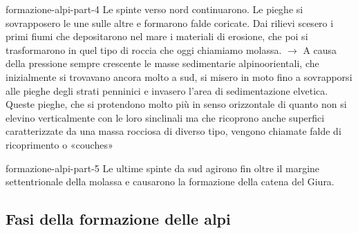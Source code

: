 \documentclass[preview]{standalone}
\begin{document}

\begin{snippet}{formazione-alpi-part-4}
    Le spinte verso nord continuarono. Le pieghe si sovrapposero le une sulle altre e
    formarono falde coricate. Dai rilievi scesero i primi fiumi che depositarono nel mare i materiali di
    erosione, che poi si trasformarono in quel tipo di roccia che oggi chiamiamo molassa. \(\rightarrow\) A causa
    della pressione sempre crescente le masse sedimentarie alpinoorientali, che inizialmente si
    trovavano ancora molto a sud, si misero in moto fino a sovrapporsi alle pieghe degli strati penninici
    e invasero l'area di sedimentazione elvetica. Queste pieghe, che si protendono molto più in senso
    orizzontale di quanto non si elevino verticalmente con le loro sinclinali ma che ricoprono anche
    superfici caratterizzate da una massa rocciosa di diverso tipo, vengono chiamate falde di
    ricoprimento o «couches»
\end{snippet}


\begin{snippet}{formazione-alpi-part-5}
    Le ultime spinte da sud agirono fin oltre il margine settentrionale della molassa e
    causarono la formazione della catena del Giura.
\end{snippet}

\subsection{Fasi della formazione delle alpi}
\end{document}
